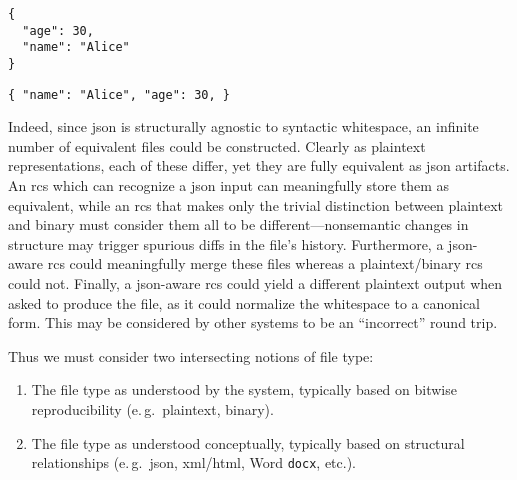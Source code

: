 \documentclass[twoside]{article}
\begin{document}
\begin{lstlisting}[style=listingcode]
{
  "age": 30,
  "name": "Alice"
}
\end{lstlisting}

\begin{lstlisting}[style=listingcode]
{ "name": "Alice", "age": 30, }
\end{lstlisting}

Indeed, since {\sc json} is structurally agnostic to syntactic whitespace, an infinite number of equivalent files could be constructed.  Clearly as plaintext representations, each of these differ, yet they are fully equivalent as {\sc json} artifacts.  An {\sc rcs} which can recognize a {\sc json} input can meaningfully store them as equivalent, while an {\sc rcs} that makes only the trivial distinction between plaintext and binary must consider them all to be different—nonsemantic changes in structure may trigger spurious diffs in the file's history.  Furthermore, a {\sc json}-aware {\sc rcs} could meaningfully merge these files whereas a plaintext/binary {\sc rcs} could not.  Finally, a {\sc json}-aware {\sc rcs} could yield a different plaintext output when asked to produce the file, as it could normalize the whitespace to a canonical form.  This may be considered by other systems to be an ``incorrect'' round trip.

Thus we must consider two intersecting notions of file type:
\begin{enumerate}
  \item The file type as understood by the system, typically based on bitwise reproducibility (e.\,g.\ plaintext, binary).
  \item The file type as understood conceptually, typically based on structural relationships (e.\,g.\ {\sc json}, {\sc xml}/{\sc html}, Word \texttt{docx}, etc.).
\end{enumerate}
\end{document}

